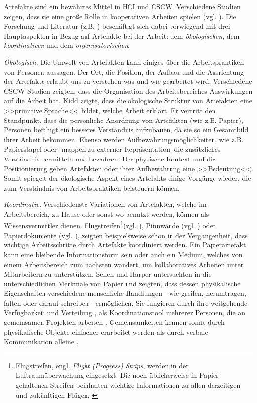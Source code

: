 \medskip Artefakte sind ein bewährtes Mittel in \ac{HCI} und \ac{CSCW}. Verschiedene Studien zeigen, dass sie eine große Rolle in kooperativen Arbeiten spielen (vgl. \citealp{Bardram:2005, Heath:1992, Hutchins:1995, Robinson:1993, Schmidt:2002, Sellen:2003, Shapiro:1994, Vyas:2008}). Die Forschung und Literatur (z.B. \citealp{Randall:2007}) beschäftigt sich dabei vorwiegend mit drei Hauptaspekten in Bezug auf Artefakte bei der Arbeit: dem \emph{ökologischen}, dem \emph{koordinativen} und dem \emph{organisatorischen}.

\medskip \emph{Ökologisch.} Die Umwelt von Artefakten kann einiges über die Arbeitspraktiken von Personen aussagen. Der Ort, die Position, der Aufbau und die Ausrichtung der Artefakte erlaubt uns zu verstehen was und wie gearbeitet wird. Verschiedene \ac{CSCW} Studien \citep{Heath:1992, Sellen:2003} zeigten, dass die Organisation des Arbeitsbereiches Auswirkungen auf die Arbeit hat. Kidd \citep{Kidd:1994} zeigte, dass die ökologische Struktur von Artefakten eine >>primitive Sprache<< bildet, welche Arbeit erklärt. Er vertritt den Standpunkt, dass die persönliche Anordnung von Artefakten (wie z.B. Papier), Personen befähigt ein besseres Verständnis aufzubauen, da sie so ein Gesamtbild ihrer Arbeit bekommen. Ebenso werden Aufbewahrungsmöglichkeiten, wie z.B. Papierstapel oder -mappen zu externer Repräsentation, die zusätzliches Verständnis vermitteln und bewahren. Der physische Kontext und die Positionierung geben Artefakten oder ihrer Aufbewahrung eine >>Bedeutung<<. Somit spiegelt der ökologische Aspekt eines Artefakts einige Vorgänge wieder, die zum Verständnis von Arbeitspraktiken beisteuern können.

\medskip \emph{Koordinativ.} Verschiedenste Variationen von Artefakten, welche im Arbeitsbereich, zu Hause oder sonst wo benutzt werden, können als Wissensvermittler dienen. Flugstreifen\footnote{Flugstreifen, engl. \emph{Flight (Progress) Strips}, werden in der Luftraumüberwachung eingesetzt. Die noch üblicherweise in Papier gehaltenen Streifen beinhalten wichtige Informationen zu allen derzeitigen und zukünftigen Flügen. \citep{Bentley:1992}}(vgl. \citealp{Shapiro:1994}), Pinnwände (vgl. \citealp{Bardram:2005}) oder Papierdokumente (vgl. \citealp{Sellen:2003}), zeigten beispielsweise schon in der Vergangenheit, dass wichtige Arbeitsschritte durch Artefakte koordiniert werden. Ein Papierartefakt kann eine bleibende Informationsform sein oder auch ein Medium, welches von einem Arbeitsbereich zum nächsten wandert, um kollaboratives Arbeiten unter Mitarbeitern zu unterstützen. Sellen und Harper untersuchten in \citep{Sellen:2003} die unterschiedlichen Merkmale von Papier und zeigten, dass dessen physikalische Eigenschaften verschiedene menschliche Handlungen - wie greifen, herumtragen, falten oder darauf schreiben - ermöglichen. Sie fungieren durch ihre weitgehende Verfügbarkeit \citep{Heath:1992} und Verteilung \citep{Robinson:1993}, als Koordinationstool mehrerer Personen, die an gemeinsamen Projekten arbeiten \citep{Vyas:2008}. Gemeinsamkeiten können somit durch physikalische Objekte einfacher erarbeitet werden als durch verbale Kommunikation alleine \citep{Larsson:2003}.

